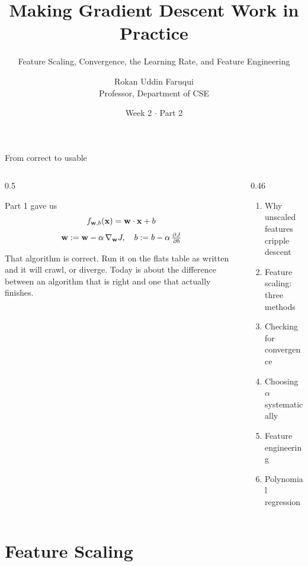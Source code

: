 \documentclass[aspectratio=169,10pt]{beamer}
\title[CSE 815 -- Week 2, Part 2]{Making Gradient Descent Work in Practice}
\subtitle{Feature Scaling, Convergence, the Learning Rate, and Feature Engineering}
\author{Rokan Uddin Faruqui\\ \small Professor, Department of CSE}
\institute{\small University of Chittagong \\ \texttt{rufaruqui@cu.ac.bd}}
\date[Week 2 / Part 2]{Week 2 $\cdot$ Part 2}
\begin{document}
\begin{frame}
  \titlepage
\end{frame}

\begin{frame}{From correct to usable}
  \begin{columns}[T,onlytextwidth]
    \begin{column}{0.5\textwidth}
      \begin{block}{Part 1 gave us}
        \[ f_{\mathbf{w},b}(\mathbf{x})=\mathbf{w}\cdot\mathbf{x}+b \]
        \[ \mathbf{w} := \mathbf{w} - \alpha\,\nabla_{\mathbf{w}}J,\quad b := b - \alpha\,\tfrac{\partial J}{\partial b} \]
      \end{block}
      \footnotesize
      That algorithm is correct. Run it on the flats table as written and it will crawl,
      or diverge. Today is about the difference between an algorithm that is right and one
      that actually finishes.
    \end{column}
    \begin{column}{0.46\textwidth}
      \begin{keyidea}[Today]
        \footnotesize
        \begin{enumerate}
          \item Why unscaled features cripple descent %
          \item Feature scaling: three methods %
          \item Checking for convergence %
          \item Choosing $\alpha$ systematically %
          \item Feature engineering %
          \item Polynomial regression %
        \end{enumerate}
      \end{keyidea}
    \end{column}
  \end{columns}
\end{frame}

\section{Feature Scaling}
\end{document}
